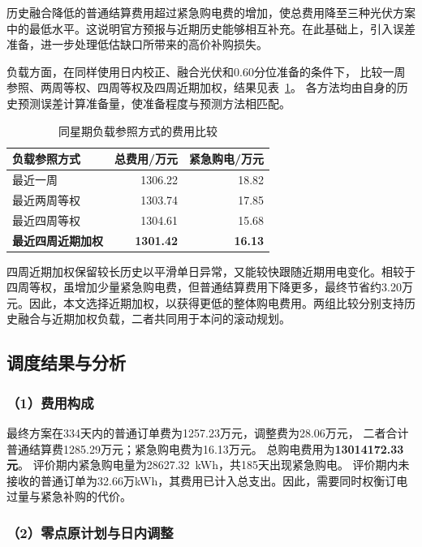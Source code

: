 历史融合降低的普通结算费用超过紧急购电费的增加，使总费用降至三种光伏方案中的最低水平。这说明官方预报与近期历史能够相互补充。在此基础上，引入误差准备，进一步处理低估缺口所带来的高价补购损失。

负载方面，在同样使用日内校正、融合光伏和0.60分位准备的条件下，
比较一周参照、两周等权、四周等权及四周近期加权，结果见表~\ref{tab:q3_load_compare}。
各方法均由自身的历史预测误差计算准备量，使准备程度与预测方法相匹配。

\begin{table}[H]
\centering
\caption{同星期负载参照方式的费用比较}
\label{tab:q3_load_compare}
\begin{tabular}{lrr}
\toprule
负载参照方式 & 总费用/万元 & 紧急购电/万元\\
\midrule
最近一周 &1306.22&18.82\\
最近两周等权 &1303.74&17.85\\
最近四周等权 &1304.61&15.68\\
\textbf{最近四周近期加权} &\textbf{1301.42}&\textbf{16.13}\\
\bottomrule
\end{tabular}
\end{table}

四周近期加权保留较长历史以平滑单日异常，又能较快跟随近期用电变化。相较于四周等权，虽增加少量紧急购电费，但普通结算费用下降更多，最终节省约3.20万元。因此，本文选择近期加权，以获得更低的整体购电费用。两组比较分别支持历史融合与近期加权负载，二者共同用于本问的滚动规划。

\subsection{调度结果与分析}

\subsubsection*{（1）费用构成}

最终方案在334天内的普通订单费为1257.23万元，调整费为28.06万元，
二者合计普通结算费1285.29万元；紧急购电费为16.13万元。
总购电费用为\textbf{13014172.33元}。
评价期内紧急购电量为28627.32~kWh，共185天出现紧急购电。
评价期内未接收的普通订单为32.66万kWh，其费用已计入总支出。因此，需要同时权衡订电过量与紧急补购的代价。

\subsubsection*{（2）零点原计划与日内调整}


